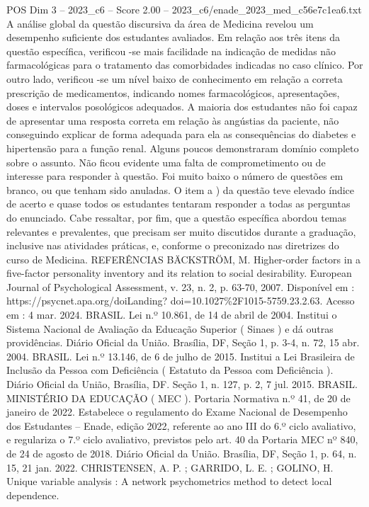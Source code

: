 \begin{textsample}{POS Dim 3 – 2023\_c6 – Score 2.00 – 2023\_c6/enade\_2023\_med\_c56e7c1ea6.txt}
A análise global da questão discursiva da área de Medicina revelou um desempenho suficiente dos estudantes avaliados.
Em relação aos três itens da questão específica, verificou -se mais facilidade na indicação de medidas não farmacológicas para o tratamento das comorbidades indicadas no caso clínico.
Por outro lado, verificou -se um nível baixo de conhecimento em relação a correta prescrição de medicamentos, indicando nomes farmacológicos, apresentações, doses e intervalos posológicos adequados.
A maioria dos estudantes não foi capaz de apresentar uma resposta correta em relação às angústias da paciente, não conseguindo explicar de forma adequada para ela as consequências do diabetes e hipertensão para a função renal.
Alguns poucos demonstraram domínio completo sobre o assunto.
Não ficou evidente uma falta de comprometimento ou de interesse para responder à questão.
Foi muito baixo o número de questões em branco, ou que tenham sido anuladas.
O item a ) da questão teve elevado índice de acerto e quase todos os estudantes tentaram responder a todas as perguntas do enunciado.
Cabe ressaltar, por fim, que a questão específica abordou temas relevantes e prevalentes, que precisam ser muito discutidos durante a graduação, inclusive nas atividades práticas, e, conforme o preconizado nas diretrizes do curso de Medicina.
REFERÊNCIAS BÄCKSTRÖM, M.
Higher-order factors in a five-factor personality inventory and its relation to social desirability.
European Journal of Psychological Assessment, v. 23, n. 2, p. 63-70, 2007.
Disponível em : https://psycnet.apa.org/doiLanding? doi=10.1027\%2F1015-5759.23.2.63.
Acesso em : 4 mar. 2024.
BRASIL.
Lei n.º 10.861, de 14 de abril de 2004.
Institui o Sistema Nacional de Avaliação da Educação Superior ( Sinaes ) e dá outras providências.
Diário Oficial da União.
Brasília, DF, Seção 1, p. 3-4, n. 72, 15 abr. 2004.
BRASIL.
Lei n.º 13.146, de 6 de julho de 2015.
Institui a Lei Brasileira de Inclusão da Pessoa com Deficiência ( Estatuto da Pessoa com Deficiência ).
Diário Oficial da União, Brasília, DF.
Seção 1, n. 127, p. 2, 7 jul. 2015.
BRASIL.
MINISTÉRIO DA EDUCAÇÃO ( MEC ).
Portaria Normativa n.º 41, de 20 de janeiro de 2022.
Estabelece o regulamento do Exame Nacional de Desempenho dos Estudantes – Enade, edição 2022, referente ao ano III do 6.º ciclo avaliativo, e regulariza o 7.º ciclo avaliativo, previstos pelo art. 40 da Portaria MEC nº 840, de 24 de agosto de 2018.
Diário Oficial da União.
Brasília, DF, Seção 1, p. 64, n. 15, 21 jan. 2022.
CHRISTENSEN, A.
P. ; GARRIDO, L.
E. ; GOLINO, H.
Unique variable analysis : A network psychometrics method to detect local dependence.

\end{textsample}
